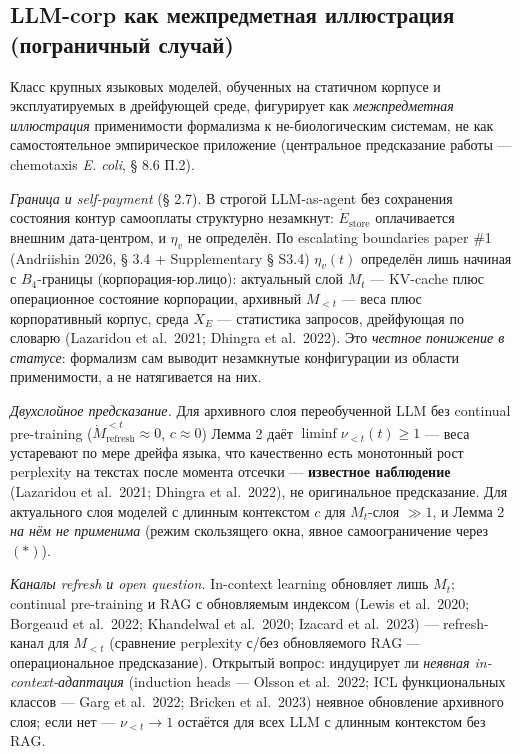 \documentclass[pdflatex,sn-mathphys-ay]{sn-jnl}
\providecommand{\lt}{<}\providecommand{\gt}{>}
\begin{document}
\subsection{LLM-corp как межпредметная иллюстрация (пограничный случай)}\label{llm-corp-ux43aux430ux43a-ux43cux435ux436ux43fux440ux435ux434ux43cux435ux442ux43dux430ux44f-ux438ux43bux43bux44eux441ux442ux440ux430ux446ux438ux44f-ux43fux43eux433ux440ux430ux43dux438ux447ux43dux44bux439-ux441ux43bux443ux447ux430ux439}



Класс крупных языковых моделей, обученных на статичном корпусе и эксплуатируемых в дрейфующей среде, фигурирует как \emph{межпредметная иллюстрация} применимости формализма к не-биологическим системам, не как самостоятельное эмпирическое приложение (центральное предсказание работы --- chemotaxis \emph{E. coli}, § 8.6 П.2).



\emph{Граница и self-payment} (§ 2.7). В строгой LLM-as-agent без сохранения состояния контур самооплаты структурно незамкнут: \(\dot E_{\text{store}}\) оплачивается внешним дата-центром, и \(\eta_v\) не определён. По escalating boundaries paper \#1 (Andriishin 2026, § 3.4 + Supplementary § S3.4) \(\eta_v(t)\) определён лишь начиная с \(B_4\)-границы (корпорация-юр.лицо): актуальный слой \(M_t\) --- KV-cache плюс операционное состояние корпорации, архивный \(M_{\lt t}\) --- веса плюс корпоративный корпус, среда \(X_E\) --- статистика запросов, дрейфующая по словарю (Lazaridou et al.~2021; Dhingra et al.~2022). Это \emph{честное понижение в статусе}: формализм сам выводит незамкнутые конфигурации из области применимости, а не натягивается на них.



\emph{Двухслойное предсказание.} Для архивного слоя переобученной LLM без continual pre-training (\(\dot{M}_{\text{refresh}}^{\lt t} \approx 0\), \(c \approx 0\)) Лемма 2 даёт \(\liminf \nu_{\lt t}(t) \ge 1\) --- веса устаревают по мере дрейфа языка, что качественно есть монотонный рост perplexity на текстах после момента отсечки --- \textbf{известное наблюдение} (Lazaridou et al.~2021; Dhingra et al.~2022), не оригинальное предсказание. Для актуального слоя моделей с длинным контекстом \(c\) для \(M_t\)-слоя \(\gg 1\), и Лемма 2 \emph{на нём не применима} (режим скользящего окна, явное самоограничение через \((*)\)).



\emph{Каналы refresh и open question.} In-context learning обновляет лишь \(M_t\); continual pre-training и RAG с обновляемым индексом (Lewis et al.~2020; Borgeaud et al.~2022; Khandelwal et al.~2020; Izacard et al.~2023) --- refresh-канал для \(M_{\lt t}\) (сравнение perplexity с/без обновляемого RAG --- операциональное предсказание). Открытый вопрос: индуцирует ли \emph{неявная in-context-адаптация} (induction heads --- Olsson et al.~2022; ICL функциональных классов --- Garg et al.~2022; Bricken et al.~2023) неявное обновление архивного слоя; если нет --- \(\nu_{\lt t} \to 1\) остаётся для всех LLM с длинным контекстом без RAG.
\end{document}
